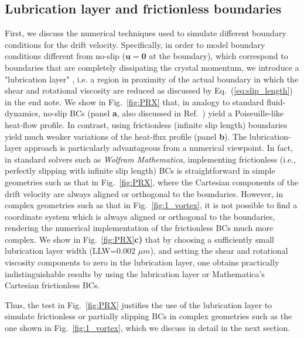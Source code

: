\documentclass[
prb,
twocolumn,
superscriptaddress,
 amsmath,amssymb,
 aps,
longbibliography,
]{revtex4-2}
\begin{document}
\subsection{Lubrication layer and frictionless boundaries}
\label{sub:slipping_boundaries}
First, we discuss the numerical techniques used to simulate different boundary conditions for the drift velocity.
Specifically, in order to model boundary conditions different from no-slip ($\bm{u}{=}\bm{0}$ at the boundary), which correspond to boundaries that are completely dissipating the crystal momentum, we introduce a "lubrication layer" \cite{bocquetFlowBoundaryConditions2007}, i.e. a region in proximity of the actual boundary in which the shear and rotational viscosity are reduced as discussed by Eq.~(\ref{eq:slip_length}) in the end note.
We show in Fig.~\ref{fig:PRX} that, in analogy to standard fluid-dynamics, no-slip BCs (panel \textbf{a}, also discussed in Ref.~\cite{Simoncelli2020}) yield a Poiseuille-like heat-flow profile. In contrast, using frictionless (infinite slip length) boundaries yield much weaker variations of the heat-flux profile (panel \textbf{b}).
The lubrication-layer approach is particularly advantageous from a numerical viewpoint. In fact, in standard solvers such as \textit{Wolfram Mathematica}, implementing frictionless (i.e., perfectly slipping with infinite slip length) BCs is straightforward in simple geometries such as that in Fig.~\ref{fig:PRX}, where the Cartesian components of the drift velocity are always aligned or orthogonal to the boundaries. However, in complex geometries such as that in Fig.~\ref{fig:1_vortex},
it is not possible to find a coordinate system which is always aligned or orthogonal to the boundaries, rendering the numerical implementation of the frictionless BCs much more complex.
We show in Fig.~\ref{fig:PRX}\textbf{c)} that by choosing a sufficiently small lubrication layer width (LLW=0.002 $\mu m$), and setting the shear and rotational viscosity components to zero in the lubrication layer, one obtains practically indistinguishable results by using the lubrication layer or Mathematica's Cartesian frictionless BCs.

Thus, the test in Fig.~\ref{fig:PRX} justifies the use of the lubrication layer to simulate frictionless or partially slipping BCs in complex geometries such as the one shown in Fig.~\ref{fig:1_vortex}, which we discuss in detail in the next section.
\end{document}
